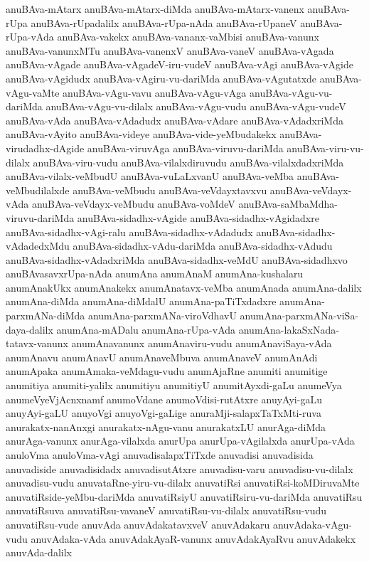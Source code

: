 {anuBAva-mAtarx
anuBAva-mAtarx-diMda
anuBAva-mAtarx-vanenx
anuBAva-rUpa
anuBAva-rUpadalilx
anuBAva-rUpa-nAda
anuBAva-rUpaneV
anuBAva-rUpa-vAda
anuBAva-vakekx
anuBAva-vananx-vaMbisi
anuBAva-vanunx
anuBAva-vanunxMTu
anuBAva-vanenxV
anuBAva-vaneV
anuBAva-vAgada
anuBAva-vAgade
anuBAva-vAgadeV-iru-vudeV
anuBAva-vAgi
anuBAva-vAgide
anuBAva-vAgidudx
anuBAva-vAgiru-vu-dariMda
anuBAva-vAgutatxde
anuBAva-vAgu-vaMte
anuBAva-vAgu-vavu
anuBAva-vAgu-vAga
anuBAva-vAgu-vu-dariMda
anuBAva-vAgu-vu-dilalx
anuBAva-vAgu-vudu
anuBAva-vAgu-vudeV
anuBAva-vAda
anuBAva-vAdadudx
anuBAva-vAdare
anuBAva-vAdadxriMda
anuBAva-vAyito
anuBAva-videye
anuBAva-vide-yeMbudakekx
anuBAva-virudadhx-dAgide
anuBAva-viruvAga
anuBAva-viruvu-dariMda
anuBAva-viru-vu-dilalx
anuBAva-viru-vudu
anuBAva-vilalxdiruvudu
anuBAva-vilalxdadxriMda
anuBAva-vilalx-veMbudU
anuBAva-vuLaLxvanU
anuBAva-veMba
anuBAva-veMbudilalxde
anuBAva-veMbudu
anuBAva-veVdayxtavxvu
anuBAva-veVdayx-vAda
anuBAva-veVdayx-veMbudu
anuBAva-voMdeV
anuBAva-saMbaMdha-viruvu-dariMda
anuBAva-sidadhx-vAgide
anuBAva-sidadhx-vAgidadxre
anuBAva-sidadhx-vAgi-ralu
anuBAva-sidadhx-vAdadudx
anuBAva-sidadhx-vAdadedxMdu
anuBAva-sidadhx-vAdu-dariMda
anuBAva-sidadhx-vAdudu
anuBAva-sidadhx-vAdadxriMda
anuBAva-sidadhx-veMdU
anuBAva-sidadhxvo
anuBAvasavxrUpa-nAda
anumAna
anumAnaM
anumAna-kushalaru
anumAnakUkx
anumAnakekx
anumAnatavx-veMba
anumAnada
anumAna-dalilx
anumAna-diMda
anumAna-diMdalU
anumAna-paTiTxdadxre
anumAna-parxmANa-diMda
anumAna-parxmANa-viroVdhavU
anumAna-parxmANa-viSa-daya-dalilx
anumAna-mADalu
anumAna-rUpa-vAda
anumAna-lakaSxNada-tatavx-vanunx
anumAnavanunx
anumAnaviru-vudu
anumAnaviSaya-vAda
anumAnavu
anumAnavU
anumAnaveMbuva
anumAnaveV
anumAnAdi
anumApaka
anumAmaka-veMdagu-vudu
anumAjaRne
anumiti
anumitige
anumitiya
anumiti-yalilx
anumitiyu
anumitiyU
anumitAyxdi-gaLu
anumeVya
anumeVyeVjAcnxnamf
anumoVdane
anumoVdisi-rutAtxre
anuyAyi-gaLu
anuyAyi-gaLU
anuyoVgi
anuyoVgi-gaLige
anuraMji-salapxTaTxMti-ruva
anurakatx-nanAnxgi
anurakatx-nAgu-vanu
anurakatxLU
anurAga-diMda
anurAga-vanunx
anurAga-vilalxda
anurUpa
anurUpa-vAgilalxda
anurUpa-vAda
anuloVma
anuloVma-vAgi
anuvadisalapxTiTxde
anuvadisi
anuvadisida
anuvadiside
anuvadisidadx
anuvadisutAtxre
anuvadisu-varu
anuvadisu-vu-dilalx
anuvadisu-vudu
anuvataRne-yiru-vu-dilalx
anuvatiRsi
anuvatiRsi-koMDiruvaMte
anuvatiRside-yeMbu-dariMda
anuvatiRsiyU
anuvatiRsiru-vu-dariMda
anuvatiRsu
anuvatiRsuva
anuvatiRsu-vavaneV
anuvatiRsu-vu-dilalx
anuvatiRsu-vudu
anuvatiRsu-vude
anuvAda
anuvAdakatavxveV
anuvAdakaru
anuvAdaka-vAgu-vudu
anuvAdaka-vAda
anuvAdakAyaR-vanunx
anuvAdakAyaRvu
anuvAdakekx
anuvAda-dalilx
}

